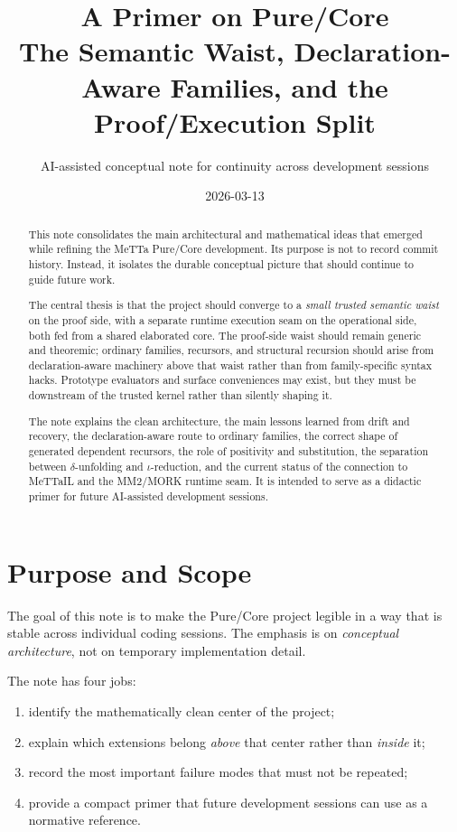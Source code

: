 \documentclass[11pt]{article}
\title{A Primer on \MeTTa{} Pure/Core\\
\large The Semantic Waist, Declaration-Aware Families, and the Proof/Execution Split}
\author{AI-assisted conceptual note for continuity across development sessions}
\date{2026-03-13}
\newcommand{\MeTTa}{\textup{MeTTa}}
\newcommand{\MeTTaIL}{\textup{MeTTaIL}}
\newcommand{\MORK}{\textup{MORK}}
\newcommand{\MMTwo}{\textup{MM2}}
\begin{document}
\maketitle

\begin{abstract}
This note consolidates the main architectural and mathematical ideas that emerged
while refining the \MeTTa{} Pure/Core development. Its purpose is not to record
commit history. Instead, it isolates the durable conceptual picture that should
continue to guide future work.

The central thesis is that the project should converge to a \emph{small trusted
semantic waist} on the proof side, with a separate runtime execution seam on the
operational side, both fed from a shared elaborated core. The proof-side waist
should remain generic and theoremic; ordinary families, recursors, and
structural recursion should arise from declaration-aware machinery above that
waist rather than from family-specific syntax hacks. Prototype evaluators and
surface conveniences may exist, but they must be downstream of the trusted
kernel rather than silently shaping it.

The note explains the clean architecture, the main lessons learned from drift and
recovery, the declaration-aware route to ordinary families, the correct shape of
generated dependent recursors, the role of positivity and substitution, the
separation between $\delta$-unfolding and $\iota$-reduction, and the current
status of the connection to \MeTTaIL{} and the \MMTwo{}/\MORK{} runtime seam.
It is intended to serve as a didactic primer for future AI-assisted development
sessions.
\end{abstract}

\tableofcontents

\section{Purpose and Scope}

The goal of this note is to make the Pure/Core project legible in a way that is
stable across individual coding sessions. The emphasis is on \emph{conceptual
architecture}, not on temporary implementation detail.

The note has four jobs:
\begin{enumerate}[leftmargin=2em]
  \item identify the mathematically clean center of the project;
  \item explain which extensions belong \emph{above} that center rather than
  \emph{inside} it;
  \item record the most important failure modes that must not be repeated;
  \item provide a compact primer that future development sessions can use as a
  normative reference.
\end{enumerate}
\end{document}
